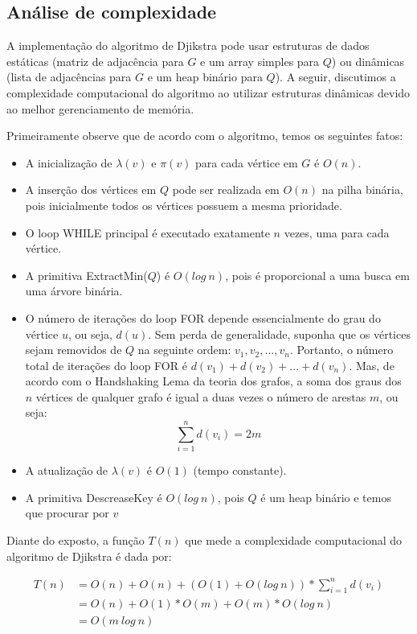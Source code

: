 \documentclass[sn-mathphys,Numbered]{sn-jnl}%
\theoremstyle{thmstyleone}%
\theoremstyle{thmstyletwo}%
\theoremstyle{thmstylethree}%
\begin{document}
\subsection{Análise de complexidade}

A implementação do algoritmo de Djikstra pode usar estruturas de dados estáticas (matriz de adjacência para $G$ e um array simples para $Q$) ou dinâmicas (lista de adjacências para $G$ e um heap binário para $Q$). A seguir, discutimos a complexidade computacional do algoritmo ao utilizar estruturas dinâmicas devido ao melhor gerenciamento de memória.

Primeiramente observe que de acordo com o algoritmo, temos os seguintes fatos:

\begin{itemize}
	\item A inicialização de $\lambda(v)$ e $\pi(v)$ para cada vértice em $G$ é $O(n)$.
	\item A inserção dos vértices em $Q$ pode ser realizada em $O(n)$ na pilha binária, pois inicialmente todos os vértices possuem a mesma prioridade.
	\item O loop WHILE principal é executado exatamente $n$ vezes, uma para cada vértice.
	\item A primitiva ExtractMin($Q$) é $O(log~n)$, pois é proporcional a uma busca em uma árvore binária.
	\item O número de iterações do loop FOR depende essencialmente do grau do vértice $u$, ou seja, $d(u)$. Sem perda de generalidade, suponha que os vértices sejam removidos de $Q$ na seguinte ordem: $v_1, v_2, ..., v_n$. Portanto, o número total de iterações do loop FOR é $d(v_1) + d(v_2) + ... + d(v_n)$. Mas, de acordo com o Handshaking Lema da teoria dos grafos, a soma dos graus dos $n$ vértices de qualquer grafo é igual a duas vezes o número de arestas $m$, ou seja:
	\begin{equation}
		\sum_{i=1}^{n} d(v_i) = 2 m
	\end{equation}
	\item A atualização de $\lambda(v)$ é $O(1)$ (tempo constante).
	\item A primitiva DescreaseKey é $O(log~n)$, pois $Q$ é um heap binário e temos que procurar por $v$
\end{itemize}

Diante do exposto, a função $T(n)$ que mede a complexidade computacional do algoritmo de Djikstra é dada por:

\begin{align}
	T(n) & = O(n) + O(n) + \left( O(1) + O(log~n) \right)*\sum_{i=1}^{n} d(v_i) \\ \nonumber & = O(n) + O(1)*O(m) + O(m)*O(log~n) \\ \nonumber & = O(m~log~n)
\end{align}
\end{document}
